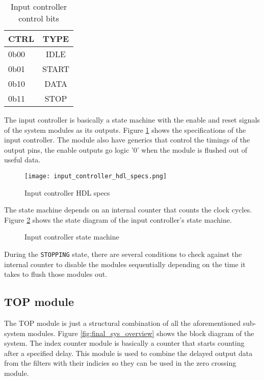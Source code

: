 \begin{table}[h]
    \centering
    \begin{tabular}{ l | c }
        CTRL & TYPE  \\
        \hline \hline
        0b00 & IDLE  \\
        0b01 & START \\
        0b10 & DATA  \\
        0b11 & STOP  \\
    \end{tabular}
    \caption{Input controller control bits}
    \label{tab:ctrl_table}
\end{table}


The input controller is basically a state machine with the enable and reset signals of the system modules as its outputs. Figure \ref{fig:input_controller_hdl_specs} shows the specifications of the input controller. The module also have generics that control the timings of the output pins, the enable outputs go logic '0' when the module is flushed out of useful data.


\begin{figure}[h]
    \centering
    \texttt{[image: input\_controller\_hdl\_specs.png]}
    \caption{Input controller HDL specs}
    \label{fig:input_controller_hdl_specs}
\end{figure}


The state machine depends on an internal counter that counts the clock cycles. Figure \ref{fig:input_controller_state_machine} shows the state diagram of the input controller's state machine.



\begin{figure}[h]
    \centering
    
    \caption{Input controller state machine}
    \label{fig:input_controller_state_machine}
\end{figure}


During the \texttt{STOPPING} state, there are several conditions to check against the internal counter to disable the modules sequentially depending on the time it takes to flush those modules out.


\subsection{TOP module}

The TOP module is just a structural combination of all the aforementioned sub-system modules. Figure \ref{fig:final_sys_overview} shows the block diagram of the system. The index counter module is basically a counter that starts counting after a specified delay. This module is used to combine the delayed output data from the filters with their indicies so they can be used in the zero crossing module.


